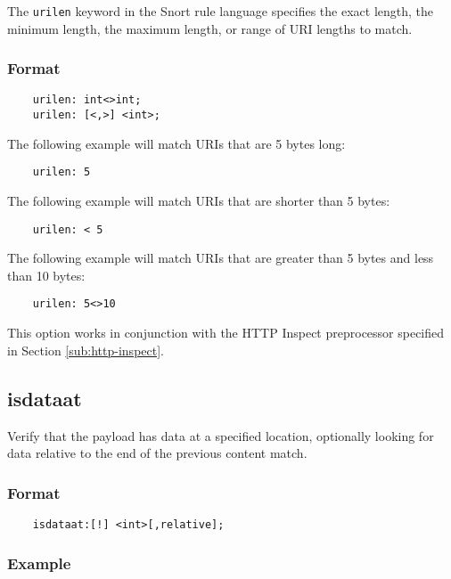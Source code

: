 \documentclass[english]{report}
\begin{document}
The \texttt{urilen} keyword in the Snort rule language specifies the exact
length, the minimum length, the maximum length, or range of URI lengths to
match.  

\subsubsection{Format}

\begin{verbatim}
    urilen: int<>int;
    urilen: [<,>] <int>;
\end{verbatim}

The following example will match URIs that are 5 bytes long:

\begin{verbatim}
    urilen: 5
\end{verbatim}

The following example will match URIs that are shorter than 5 bytes:

\begin{verbatim}
    urilen: < 5
\end{verbatim}

The following example will match URIs that are greater than 5 bytes and less
than 10 bytes:

\begin{verbatim}
    urilen: 5<>10
\end{verbatim}

This option works in conjunction with the HTTP Inspect preprocessor specified
in Section \ref{sub:http-inspect}.

\subsection{isdataat}

Verify that the payload has data at a specified location, optionally looking
for data relative to the end of the previous content match.

\subsubsection{Format}

\begin{verbatim}
    isdataat:[!] <int>[,relative];
\end{verbatim}

\subsubsection{Example}
\end{document}
